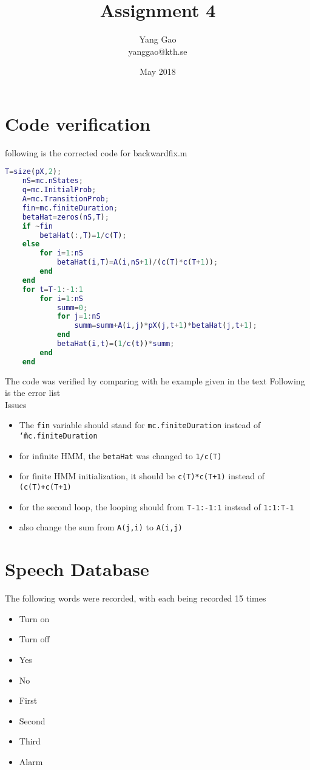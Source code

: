 \documentclass{article}
\title{Assignment 4}
\author{Yang Gao\\yanggao@kth.se}
\date{May 2018}
\begin{document}
    \maketitle
    \section{Code verification}
    following is the corrected code for backwardfix.m
    \begin{lstlisting}[language=Matlab]
    T=size(pX,2);
    nS=mc.nStates;
    q=mc.InitialProb; 
    A=mc.TransitionProb; 
    fin=mc.finiteDuration;
    betaHat=zeros(nS,T); 
    if ~fin
        betaHat(:,T)=1/c(T);
    else
        for i=1:nS
            betaHat(i,T)=A(i,nS+1)/(c(T)*c(T+1));
        end
    end
    for t=T-1:-1:1 
        for i=1:nS
            summ=0;
            for j=1:nS
                summ=summ+A(i,j)*pX(j,t+1)*betaHat(j,t+1); 
            end
            betaHat(i,t)=(1/c(t))*summ; 
        end
    end
    \end{lstlisting}
    \noindent The code was verified by comparing with he 
    example given in the text
    \noindent Following is the error list
    \noindent \\Issues
    \begin{itemize}
        \item The \texttt{fin} variable should stand for 
        \texttt{mc.finiteDuration} instead of \texttt{\char`\~mc.finiteDuration}
        \item for infinite HMM, the \texttt{betaHat} was changed to \texttt{1/c(T)}
        \item for finite HMM initialization, it should be \texttt{c(T)*c(T+1)} instead of \texttt{(c(T)+c(T+1)}
        \item for the second loop, the looping should from \texttt{T-1:-1:1} instead of \texttt{1:1:T-1}
        \item also change the sum from \texttt{A(j,i)} to \texttt{A(i,j)}
      \end{itemize}
      \section{Speech Database}
      \noindent The following words were recorded, with each being recorded 15 times
      \begin{itemize}
        \item Turn on
        \item Turn off
        \item Yes
        \item No
        \item First
        \item Second 
        \item Third
        \item Alarm
      \end{itemize}
    
     
    
\end{document}
